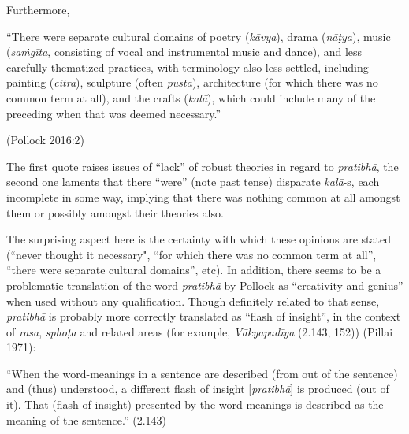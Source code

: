 
Furthermore, 

\begin{myquote}
“There were separate cultural domains of poetry (\textsl{kāvya}), drama (\textsl{nāṭya}), music (\textsl{saṁgīta}, consisting of vocal and instrumental music and dance), and less carefully thematized practices, with terminology also less settled, including painting (\textsl{citra}), sculpture (often \textsl{pusta}), architecture (for which there was no common term at all), and the crafts (\textsl{kalā}), which could include many of the preceding when that was deemed necessary.” 

\hfill(Pollock 2016:2)
\end{myquote}


The first quote raises issues of “lack” of robust theories in regard to \textsl{pratibhā}, the second one laments that there “were” (note past tense) disparate \textsl{kalā}-s, each incomplete in some way, implying that there was nothing common at all amongst them or possibly amongst their theories also.

The surprising aspect here is the certainty with which these opinions are stated (``never thought it necessary", “for which there was no common term at all”, “there were separate cultural domains”, etc). In addition, there seems to be a problematic translation of the word \textsl{pratibhā} by Pollock as “creativity and genius” when used without any qualification. Though definitely related to that sense, \textsl{pratibhā} is probably more correctly translated as “flash of insight”, in the context of \textsl{rasa}, \textsl{sphoṭa} and related areas (for example, \textsl{Vākyapadīya} (2.143, 152)) (Pillai 1971):

“When the word-meanings in a sentence are described (from out of the sentence) and (thus) understood, a different flash of insight [\textsl{pratibhā}] is produced (out of it). That (flash of insight) presented by the word-meanings is described as the meaning of the sentence.” (2.143)

